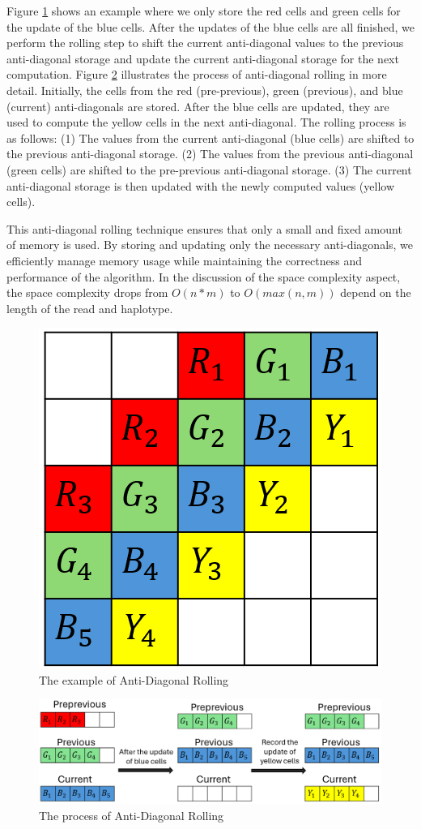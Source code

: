 \documentclass[PhD]{PHlab-thesis}
\begin{document}
Figure \ref{fig:The example of Anti-Diagonal Rolling} shows an example where we only store the red cells and green cells for the update of the blue cells. After the updates of the blue cells are all finished, we perform the rolling step to shift the current anti-diagonal values to the previous anti-diagonal storage and update the current anti-diagonal storage for the next computation.
Figure \ref{fig:The process of anti-diagonal rolling} illustrates the process of anti-diagonal rolling in more detail. Initially, the cells from the red (pre-previous), green (previous), and blue (current) anti-diagonals are stored. After the blue cells are updated, they are used to compute the yellow cells in the next anti-diagonal. The rolling process is as follows:
(1) The values from the current anti-diagonal (blue cells) are shifted to the previous anti-diagonal storage.
(2) The values from the previous anti-diagonal (green cells) are shifted to the pre-previous anti-diagonal storage.
(3) The current anti-diagonal storage is then updated with the newly computed values (yellow cells).

This anti-diagonal rolling technique ensures that only a small and fixed amount of memory is used. By storing and updating only the necessary anti-diagonals, we efficiently manage memory usage while maintaining the correctness and performance of the algorithm. In the discussion of the space complexity aspect, the space complexity drops from $O(n*m)$ to $O(max(n,m))$ depend on the length of the read and haplotype.

\begin{figure}[h]
    \centering
    \includegraphics[width=0.5\linewidth]{figure/rolling-example.png}
    \caption{The example of Anti-Diagonal Rolling}
    \label{fig:The example of Anti-Diagonal Rolling}
\end{figure}
\begin{figure}[h]
    \centering
    \includegraphics[width=1.1\linewidth]{figure/theProcessOfAnti-DiagonalRolling.png}
    \caption{The process of Anti-Diagonal Rolling}
    \label{fig:The process of anti-diagonal rolling}
\end{figure}
\end{document}
